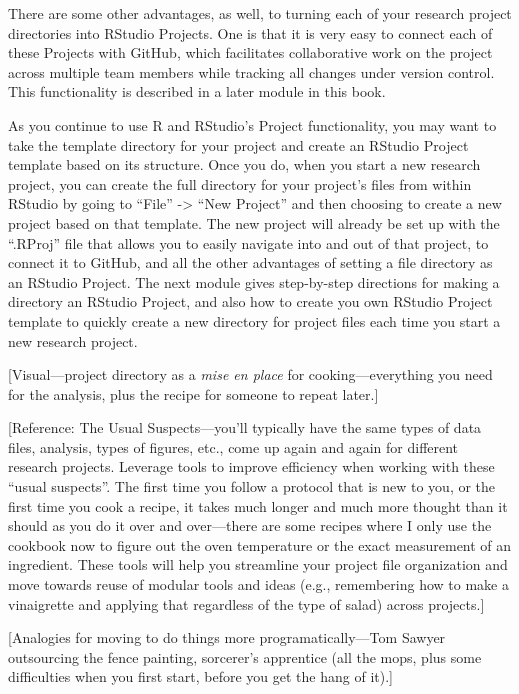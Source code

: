\documentclass[]{tufte-book}
\begin{document}
There are some other advantages, as well, to turning each of your research
project directories into RStudio Projects. One is that it is very easy to
connect each of these Projects with GitHub, which facilitates collaborative work
on the project across multiple team members while tracking all changes under
version control. This functionality is described in a later module in this book.

As you continue to use R and RStudio's Project functionality, you may want to
take the template directory for your project and create an RStudio Project
template based on its structure. Once you do, when you start a new research
project, you can create the full directory for your project's files from within
RStudio by going to ``File'' -\textgreater{} ``New Project'' and then choosing to create a new
project based on that template. The new project will already be set up with the
``.RProj'' file that allows you to easily navigate into and out of that project,
to connect it to GitHub, and all the other advantages of setting a file
directory as an RStudio Project. The next module gives step-by-step directions
for making a directory an RStudio Project, and also how to create you own
RStudio Project template to quickly create a new directory for project files
each time you start a new research project.

{[}Visual---project directory as a \emph{mise en place} for cooking---everything you
need for the analysis, plus the recipe for someone to repeat later.{]}

{[}Reference: The Usual Suspects---you'll typically have the same types of data files,
analysis, types of figures, etc., come up again and again for different research
projects. Leverage tools to improve efficiency when working with these ``usual
suspects''. The first time you follow a protocol that is new to you, or the first
time you cook a recipe, it takes much longer and much more thought than it should
as you do it over and over---there are some recipes where I only use the cookbook
now to figure out the oven temperature or the exact measurement of an ingredient.
These tools will help you streamline your project file organization and move towards
reuse of modular tools and ideas (e.g., remembering how to make a vinaigrette and
applying that regardless of the type of salad) across projects.{]}

{[}Analogies for moving to do things more programatically---Tom Sawyer outsourcing the
fence painting, sorcerer's apprentice (all the mops, plus some difficulties when you
first start, before you get the hang of it).{]}
\end{document}
